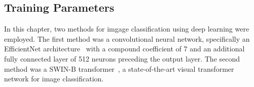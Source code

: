 \begin{table}[h]
	\centering
	\caption{Number of images per diagnosis in each dataset.}
	\label{tab:generalisation_datasets}
\end{table}

\subsection{Training Parameters}
\label{subsec:generalisation_training}
In this chapter, two methods for imgage classification using deep learning were employed. The first method was a convolutional neural network, specifically an EfficientNet architecture~\citep{tan2019efficientnet} with a compound coefficient of 7 and an additional fully connected layer of 512 neurons preceding the output layer. The second method was a SWIN-B transformer~\citep{liu2021swin}, a state-of-the-art visual transformer network for image classification.

